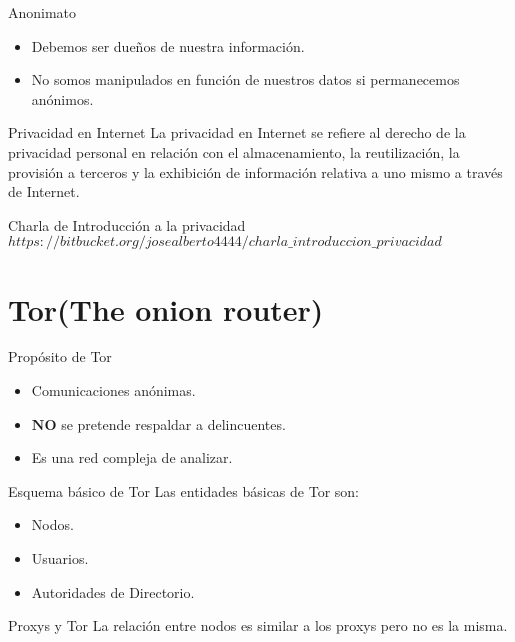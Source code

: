 \documentclass[10pt]{beamer}
\begin{document}
\begin{frame}{Anonimato}
	\begin{itemize}
		\item Debemos ser dueños de nuestra información. \pause
		\item No somos manipulados en función de nuestros datos si permanecemos anónimos. \pause
	\end{itemize}
	\begin{block}{Privacidad en Internet}
		\pause La privacidad en Internet se refiere al derecho de la privacidad personal en relación con el almacenamiento, la reutilización, la provisión a terceros y la exhibición de información relativa a uno mismo a través de Internet.
	\end{block}
	\pause
	\begin{alertblock}{Charla de Introducción a la privacidad}
		$https://bitbucket.org/josealberto4444/charla\_introduccion\_privacidad$
	\end{alertblock}
\end{frame}


\section{Tor(The onion router)}

\begin{frame}[fragile]{Propósito de Tor}
	\begin{itemize}
		\item<1-> Comunicaciones anónimas.
		\item<2-> $\boldsymbol{NO}$ se pretende respaldar a delincuentes.
		\item<3-> Es una red compleja de analizar.
	\end{itemize}
\end{frame}

\begin{frame}[fragile]{Esquema básico de Tor}
	\pause
	Las entidades básicas de Tor son:\pause
	\begin{itemize}
		\item<1-> Nodos.\pause
		\item<2-> Usuarios.\pause
		\item<3-> Autoridades de Directorio.
	\end{itemize}
	\pause
	\begin{alertblock}{Proxys y Tor}
		La relación entre nodos es similar a los proxys pero no es la misma.
	\end{alertblock}
\end{frame}
\end{document}
